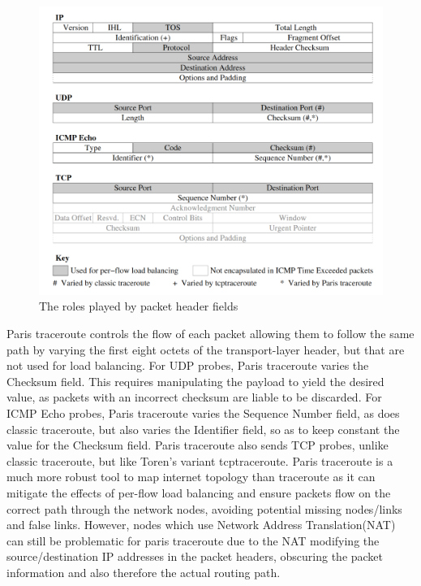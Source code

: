 \begin{figure}[h!!]
  \begin{center}
    \includegraphics[scale=0.3]{images/packet_header.png}
    \caption{The roles played by packet header fields \cite{anomalies}}
    \label{figure:packet_header_fig}
  \end{center}
\end{figure}

Paris traceroute controls the flow of each packet allowing them to follow the same path by varying the first eight octets of the transport-layer header, but that are not used for load balancing. For UDP probes, Paris traceroute varies the Checksum field. This requires manipulating the payload to yield the desired value, as packets with an incorrect checksum are liable to be discarded. For ICMP Echo probes, Paris traceroute varies the Sequence Number field, as does classic traceroute, but also varies the Identifier field, so as to keep constant the value for the Checksum
field. Paris traceroute also sends TCP probes, unlike classic traceroute, but like Toren’s variant tcptraceroute. \cite{anomalies}\cite{tcptraceroute}
Paris traceroute is a much more robust tool to map internet topology than traceroute as it can mitigate the effects of per-flow load balancing and ensure packets flow on the correct path through the network nodes, avoiding potential missing nodes/links and false links. However, nodes which use Network Address Translation(NAT) can still be problematic for paris traceroute due to the NAT modifying the source/destination IP addresses in the packet headers, obscuring the packet information and also therefore the actual routing path.

